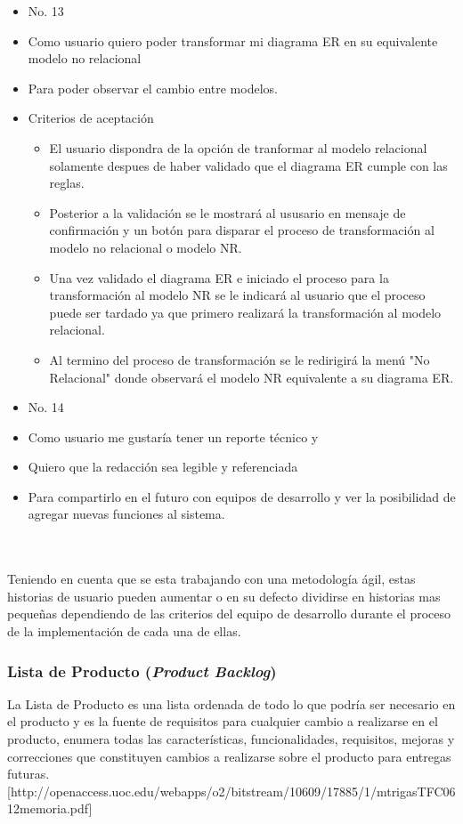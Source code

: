 \hline
\begin{itemize}
	\item No. 13
	\item Como usuario quiero poder transformar mi diagrama ER en su equivalente modelo no relacional
	\item Para poder observar el cambio entre modelos.
	\item Criterios de aceptación
	\begin{itemize}
		\item El usuario dispondra de la opción de tranformar al modelo relacional solamente despues de haber validado que el diagrama ER cumple con las reglas.
		\item Posterior a la validación se le mostrará al ususario en mensaje de confirmación y un botón para disparar el proceso de transformación al modelo no relacional o modelo NR.
		\item Una vez validado el diagrama ER e iniciado el proceso para la transformación al modelo NR se le indicará al usuario que el proceso puede ser tardado ya que primero realizará la transformación al modelo relacional.
		\item Al termino del proceso de transformación se le redirigirá la menú "No Relacional" donde observará el modelo NR equivalente a su diagrama ER.
	\end{itemize}
\end{itemize}
\hline
\begin{itemize}
	\item No. 14
	\item Como usuario me gustaría tener un reporte técnico y
	\item Quiero que la redacción sea legible y referenciada
	\item Para compartirlo en el futuro con equipos de desarrollo y ver la posibilidad de agregar nuevas funciones al sistema.
\end{itemize}
\hline

\\\\
Teniendo en cuenta que se esta trabajando con una metodología ágil, estas historias de usuario pueden aumentar o en su defecto dividirse en historias mas pequeñas dependiendo
de las criterios del equipo de desarrollo durante el proceso de la implementación de cada una de ellas.


\subsubsection{Lista de Producto (\textit{Product Backlog})}
La Lista de Producto es una lista ordenada de todo lo que podría ser necesario en el producto y es la fuente de requisitos para cualquier cambio a realizarse en el producto, enumera todas las características, funcionalidades, requisitos, mejoras y correcciones que constituyen cambios a realizarse sobre el producto para entregas futuras.[http://openaccess.uoc.edu/webapps/o2/bitstream/10609/17885/1/mtrigasTFC0612memoria.pdf]


